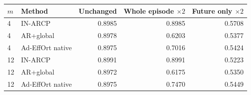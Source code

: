\begin{tabular}{llrrr}
\toprule
$m$ & Method & Unchanged & Whole episode $\times2$ & Future only $\times2$ \\
\midrule
4 & IN-ARCP & 0.8985 & 0.8985 & 0.5708 \\
4 & AR+global & 0.8978 & 0.6203 & 0.5377 \\
4 & Ad-EffOrt native & 0.8975 & 0.7016 & 0.5424 \\
12 & IN-ARCP & 0.8991 & 0.8991 & 0.5223 \\
12 & AR+global & 0.8972 & 0.6175 & 0.5350 \\
12 & Ad-EffOrt native & 0.8975 & 0.7470 & 0.5449 \\
\bottomrule
\end{tabular}
